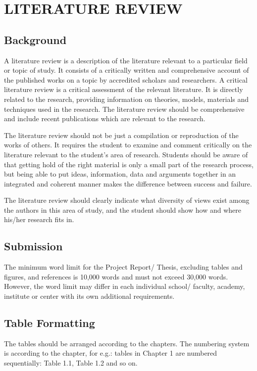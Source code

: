 \documentclass[12pt, a4paper]{report}
\begin{document}
		\chapter{\textbf{LITERATURE REVIEW}}{
			\begin{flushleft}
				\section{Background}{
					A literature review is a description of the literature relevant to a particular field or topic of study. It consists of a critically written and comprehensive account of the published works on a topic by accredited scholars and researchers. A critical literature review is a critical assessment of the relevant literature. It is directly related to the research, providing information on theories, models, materials and techniques used in the research. The literature review should be comprehensive and include recent publications which are relevant to the research.
					
					The literature review should not be just a compilation or reproduction of the works of others. It requires the student to examine and comment critically on the literature relevant to the student’s area of research. Students should be aware of that getting hold of the right material is only a small part of the research process, but being able to put ideas, information, data and arguments together in an integrated and coherent manner makes the difference between success and failure.
					
					The literature review should clearly indicate what diversity of views exist among the authors in this area of study, and the student should show how and where his/her research fits in.
				}
				\section{Submission}{
					The minimum word limit for the Project Report/ Thesis, excluding tables and figures, and references is 10,000 words and must not exceed 30,000 words. However, the word limit may differ in each individual school/ faculty, academy, institute or center with its own additional requirements.
				}
				
				\section{Table Formatting}{
					The tables should be arranged according to the chapters. The numbering system is according to the chapter, for e.g.: tables in Chapter 1 are numbered sequentially: Table 1.1, Table 1.2 and so on.
					
}
\end{flushleft}}
\end{document}
